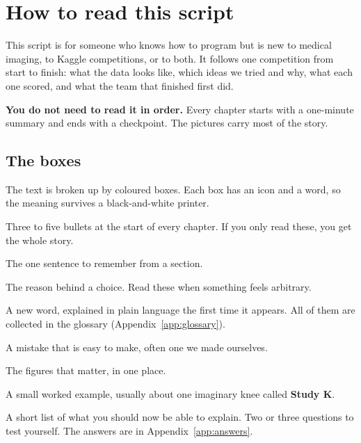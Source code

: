 \chapter*{How to read this script}

This script is for someone who knows how to program but is new to medical imaging, to Kaggle competitions,
or to both. It follows one competition from start to finish: what the data looks like, which ideas we tried
and why, what each one scored, and what the team that finished first did.

\textbf{You do not need to read it in order.} Every chapter starts with a one-minute summary and ends with a
checkpoint. The pictures carry most of the story.

\section*{The boxes}

The text is broken up by coloured boxes. Each box has an icon and a word, so the meaning survives a
black-and-white printer.

\begin{tldr}
Three to five bullets at the start of every chapter. If you only read these, you get the whole story.
\end{tldr}
\begin{keyidea}
The one sentence to remember from a section.
\end{keyidea}
\begin{why}
The reason behind a choice. Read these when something feels arbitrary.
\end{why}
\begin{wordcheck}
A new word, explained in plain language the first time it appears. All of them are collected in the glossary
(Appendix~\ref{app:glossary}).
\end{wordcheck}
\begin{watchout}
A mistake that is easy to make, often one we made ourselves.
\end{watchout}
\begin{innumbers}
The figures that matter, in one place.
\end{innumbers}
\begin{example}
A small worked example, usually about one imaginary knee called \textbf{Study K}.
\end{example}
\begin{checkpoint}
\begin{itemize}
\done A short list of what you should now be able to explain.
\quiz Two or three questions to test yourself. The answers are in Appendix~\ref{app:answers}.
\end{itemize}
\end{checkpoint}

